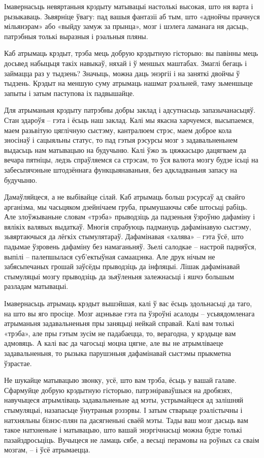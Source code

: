 Імавернасьць невяртаньня крэдыту матывацыі настолькі высокая, што ня варта і рызыкаваць. Зьвярніце ўвагу: пад вашыя фантазіі аб тым, што «аднойчы прачнуся мільянэрам» або «выйду замуж за прынца», мозг і шэлега ламанага ня дасьць, патрэбныя толькі выразныя і рэальныя пляны.

Каб атрымаць крэдыт, трэба мець добрую крэдытную гісторыю: вы павінны мець досьвед набыцьця такіх навыкаў, няхай і ў меншых маштабах. Змаглі бегаць і займацца раз у тыдзень? Значыць, можна даць энэргіі і на заняткі двойчы ў тыдзень. Крэдыт на меншую суму атрымаць нашмат рэальней, таму зьменшыце запыты і затым паступова іх падвышайце.

Для атрыманьня крэдыту патрэбны добры заклад і адсутнасьць запазычанасьцяў. Стан здароўя – гэта і ёсьць наш заклад. Калі мы якасна харчуемся, высыпаемся, маем разьвітую цяглічную сыстэму, кантралюем стрэс, маем доброе кола зносінаў і сацыяльны статус, то пад гэтыя рэсурсы мозг з задавальненьнем выдасьць нам матывацыю на будучыню. Калі ўжо зь цяжкасьцю дацягваем да вечара пятніцы, ледзь спраўляемся са стрэсам, то ўся валюта мозгу будзе ісьці на забесьпячэньне штодзённага функцыянаваньня, без адкладваньня запасу на будучыню.

Дамаўляйцеся, а не выбівайце сілай. Каб атрымаць больш рэсурсаў ад свайго арганізма, мы часьцяком дзейнічаем груба, прымушаючы сябе штосьці рабіць. Але злоўжываньне словам «трэба» прыводзіць да падзеньня ўзроўню дафаміну і вялікіх валявых выдаткаў. Многія спрабуюць падмануць дафамінавую сыстэму, зьвяртаючыся да лёгкіх стымулятараў. Дафамінавая «халява» – гэта ўсё, што падымае ўзровень дафаміну без намаганьняў. Зьелі салодкае – настрой падняўся, выпілі – палепшылася суб'ектыўная самаацэнка. Але друк нічым не забясьпечаных грошай заўсёды прыводзіць да інфляцыі. Лішак дафамінавай стымуляцыі мозгу прыводзіць да зьяўленьня залежнасьці і яшчэ большым разладам матывацыі.

Імавернасьць атрымаць крэдыт вышэйшая, калі ў вас ёсьць здольнасьці да таго, на што вы яго просіце. Мозг ацэньвае гэта па ўзроўні асалоды – усьвядомленага атрыманьня задавальненьня пры заняцьці нейкай справай. Калі вам толькі «трэба», але пры гэтым зусім не падабаецца, то, верагодна, у крэдыце вам адмовяць. А калі вас да чагосьці моцна цягне, але вы не атрымліваеце задавальненьня, то рызыка парушэньня дафамінавай сыстэмы прыкметна ўзрастае.

Не шукайце матывацыю звонку, усё, што вам трэба, ёсьць у вашай галаве. Сфармуйце добрую крэдытную гісторыю, патрэніраваўшыся на дробязях, навучыцеся атрымліваць задавальненьне ад мэты, устрымайцеся ад залішняй стымуляцыі, назапасьце ўнутраныя рэзэрвы. І затым стварыце рэалістычны і натхняльны бізнэс-плян па дасягненьні сваёй мэты. Тады ваш мозг дасьць вам такое натхненьне і матывацыю, што вашай энэргічнасьці можна будзе толькі пазайздросьціць. Вучыцеся не ламаць сябе, а весьці перамовы на роўных са сваім мозгам, – і ўсё атрымаецца.

